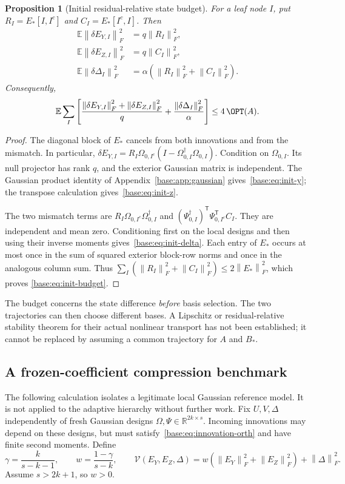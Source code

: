 \documentclass[11pt,oneside,openany,a4paper]{book}
\numberwithin{equation}{chapter}
\newtheorem{proposition}[theorem]{Proposition}
\theoremstyle{definition}
\theoremstyle{remark}
\newcommand{\R}{\mathbb R}\newcommand{\E}{\mathbb E}\newcommand{\Prb}{\mathbb P}\newcommand{\PP}{\mathbb P}
\newcommand{\T}{\mathsf T}\newcommand{\Id}{I}
\newcommand{\F}[1]{\left\lVert#1\right\rVert_F}
\begin{document}
\begin{proposition}[Initial residual-relative state budget]\label{base:prop:init-state}
For a leaf node $I$, put $R_I=E_*[I,I^c]$ and $C_I=E_*[I^c,I]$. Then
\begin{align}
 \E\F{\delta E_{Y,I}}^2&=q\F{R_I}^2,\label{base:eq:init-y}\\
 \E\F{\delta E_{Z,I}}^2&=q\F{C_I}^2,\label{base:eq:init-z}\\
 \E\F{\delta\Delta_I}^2&=\alpha(\F{R_I}^2+\F{C_I}^2).\label{base:eq:init-delta}
\end{align}
Consequently,
\begin{equation}\label{base:eq:init-budget}
 \E\sum_I\left[
 \frac{\F{\delta E_{Y,I}}^2+\F{\delta E_{Z,I}}^2}{q}
 +\frac{\F{\delta\Delta_I}^2}{\alpha}\right]
 \le4\,\OPT(A).
\end{equation}
\end{proposition}
\begin{proof}
The diagonal block of $E_*$ cancels from both innovations and from the
mismatch. In particular,
$\delta E_{Y,I}=R_I\Omega_{0,I^c}(I-\Omega_{0,I}^\dagger\Omega_{0,I})$.
Condition on $\Omega_{0,I}$. Its null projector has rank $q$, and the exterior
Gaussian matrix is independent. The Gaussian product identity of
Appendix~\ref{base:app:gaussian} gives~\eqref{base:eq:init-y}; the transpose calculation
gives~\eqref{base:eq:init-z}.

The two mismatch terms are
$R_I\Omega_{0,I^c}\Omega_{0,I}^\dagger$ and
$(\Psi_{0,I}^\dagger)^{\T}\Psi_{0,I^c}^{\T} C_I$.
They are independent and mean zero. Conditioning first on the local designs
and then using their inverse moments gives~\eqref{base:eq:init-delta}.
Each entry of $E_*$ occurs at most once in the sum of squared exterior
block-row norms and once in the analogous column sum. Thus
$\sum_I(\F{R_I}^2+\F{C_I}^2)\le2\F{E_*}^2$, which proves
\eqref{base:eq:init-budget}.\end{proof}

The budget concerns the state difference \emph{before} basis selection.
The two trajectories can then choose different bases. A Lipschitz or
residual-relative stability theorem for their actual nonlinear transport
has not been established; it cannot be replaced by assuming a common
trajectory for $A$ and $B_*$.

\subsection{A frozen-coefficient compression benchmark}
The following calculation isolates a legitimate local Gaussian reference
model. It is not applied to the adaptive hierarchy without further work.
Fix $U,V,\Delta$ independently of fresh Gaussian designs
$\Omega,\Psi\in\R^{2k\times s}$. Incoming innovations may depend on these
designs, but must satisfy~\eqref{base:eq:innovation-orth} and have finite second
moments. Define
\begin{equation}\label{base:eq:gamma-quotient}
 \gamma=\frac{k}{s-k-1},\qquad
 w=\frac{1-\gamma}{s-k},\qquad
 \mathscr V(E_Y,E_Z,\Delta)
 =w(\F{E_Y}^2+\F{E_Z}^2)+\F\Delta^2.
\end{equation}
Assume $s>2k+1$, so $w>0$.
\end{document}
